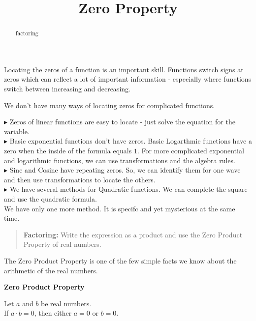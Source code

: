 \documentclass{ximera}
\title{Zero Property}
\begin{document}
\begin{abstract}
factoring
\end{abstract}
\maketitle




Locating the zeros of a function is an important skill.  Functions switch signs at zeros which can reflect a lot of important information  - especially where functions switch between increasing and decreasing.

We don't have many ways of locating zeros for complicated functions.


$\blacktriangleright$ Zeros of linear functions are easy to locate - just solve the equation for the variable. \\


$\blacktriangleright$ Basic exponential functions don't have zeros.  Basic Logarthmic functions have a zero when the inside of the formula equals $1$. For more complicated exponential and logarithmic functions, we can use transformations and the algebra rules. \\

$\blacktriangleright$ Sine and Cosine have repeating zeros. So, we can identify them for one wave and then use transformations to locate the others. \\

$\blacktriangleright$ We have several methods for Quadratic functions.  We can complete the square and use the quadratic formula. \\



We have only one more method.  It is specifc and yet mysterious at the same time.



\begin{quote}
\textbf{Factoring: } Write the expression as a product and use the Zero Product Property of real numbers.
\end{quote}



The Zero Product Property is one of the few simple facts we know about the arithmetic of the real numbers.


\begin{definition} \textbf{\textcolor{green!50!black}{Zero Product Property}}  

Let $a$ and $b$ be real numbers. \\

If $a \cdot b = 0$, then either $a=0$ or $b=0$.


\end{definition}
\end{document}
